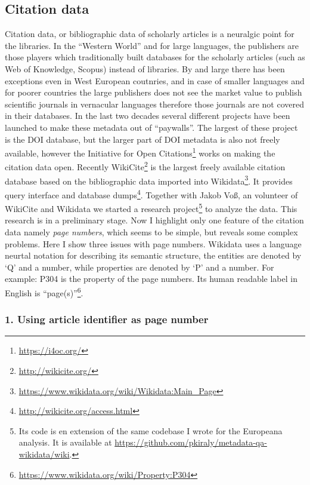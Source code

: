 \subsection{Citation data}

Citation data, or bibliographic data of scholarly articles is a neuralgic point for the libraries. In the ``Western World'' and for large languages, the publishers are those players which traditionally built databases for the scholarly articles (such as Web of Knowledge, Scopus) instead of libraries. By and large there has been exceptions even in West European coutnries, and in case of smaller languages and for poorer countries the large publishers does not see the market value to publish scientific journals in vernacular languages therefore those journals are not covered in their databases. In the last two decades several different projects have been launched to make these metadata out of ``paywalls''. The largest of these project is the DOI database, but the larger part of DOI metadata is also not freely available, however the Initiative for Open Citations\footnote{\url{https://i4oc.org/}} works on making the citation data open. Recently WikiCite\footnote{\url{http://wikicite.org/}} is the largest freely available citation database based on the bibliographic data imported into Wikidata\footnote{\url{https://www.wikidata.org/wiki/Wikidata:Main_Page}}. It provides query interface and database dumps\footnote{\url{http://wikicite.org/access.html}}. Together with Jakob Voß, an volunteer of WikiCite and Wikidata we started a research project\footnote{Its code is en extension of the same codebase I wrote for the Europeana analysis. It is available at \url{https://github.com/pkiraly/metadata-qa-wikidata/wiki}.} to analyze the data. This research is in a preliminary stage. Now I highlight only one feature of the citation data namely \emph{page numbers}, which seems to be simple, but reveals some complex problems. Here I show three issues with page numbers. Wikidata uses a language neurtal notation for describing its semantic structure, the entities are denoted by `Q' and a number, while properties are denoted by `P' and a number. For example: P304 is the property of the page numbers. Its human readable label in English is ``page(s)''\footnote{\url{https://www.wikidata.org/wiki/Property:P304}}.

\subsubsection{1. Using article identifier as page number}

